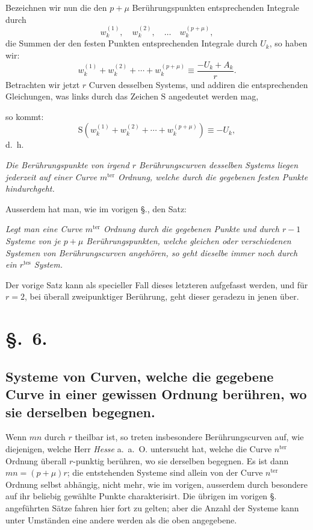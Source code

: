 \documentclass{article}
\begin{document}
Bezeichnen wir nun die den $p+\mu$ Berührungspunkten entsprechenden Integrale durch
\[ w_{k}^{(1)}, \quad w_{k}^{(2)}, \quad \ldots \quad w_{k}^{(p+\mu)}, \]
die Summen der den festen Punkten entsprechenden Integrale durch $U_{k}$, so haben wir:
\[ w_{k}^{(1)} + w_{k}^{(2)} + \cdots + w_{k}^{(p+\mu)} \equiv \frac{-U_{k} + A_{k}}{r}. \]
Betrachten wir jetzt $r$ Curven desselben Systems, und addiren die entsprechenden Gleichungen, was links durch das Zeichen $\mathrm{S}$ angedeutet werden mag,

so kommt:
\[ \mathrm{S}(w_{k}^{(1)} + w_{k}^{(2)} + \cdots + w_{k}^{(p+\mu)}) \equiv -U_{k}, \]
d.\ h.

\emph{Die Berührungspunkte von irgend $r$ Berührungscurven desselben Systems liegen jederzeit auf einer Curve $m^{\text{ter}}$ Ordnung, welche durch die gegebenen festen Punkte hindurchgeht.}

Ausserdem hat man, wie im vorigen §., den Satz:

\emph{Legt man eine Curve $m^{\text{ter}}$ Ordnung durch die gegebenen Punkte und durch $r-1$ Systeme von je $p+\mu$ Berührungspunkten, welche gleichen oder verschiedenen Systemen von Berührungscurven angehören, so geht dieselbe immer noch durch ein $r^{\text{tes}}$ System.}

Der vorige Satz kann als specieller Fall dieses letzteren aufgefasst werden, und für $r = 2$, bei überall zweipunktiger Berührung, geht dieser geradezu in jenen über.

\section*{§.~6.}
\subsection*{Systeme von Curven, welche die gegebene Curve in einer gewissen Ordnung berühren, wo sie derselben begegnen.}

Wenn $mn$ durch $r$ theilbar ist, so treten insbesondere Berührungscurven auf, wie diejenigen, welche Herr \emph{Hesse} a.\ a.\ O. untersucht hat, welche die Curve $n^{\text{ter}}$ Ordnung überall $r$-punktig berühren, wo sie derselben begegnen. Es ist dann $mn = (p+\mu)r$; die entstehenden Systeme sind allein von der Curve $n^{\text{ter}}$ Ordnung selbst abhängig, nicht mehr, wie im vorigen, ausserdem durch besondere auf ihr beliebig gewählte Punkte charakterisirt. Die übrigen im vorigen §. angeführten Sätze fahren hier fort zu gelten; aber die Anzahl der Systeme kann unter Umständen eine andere werden als die oben angegebene.
\end{document}
